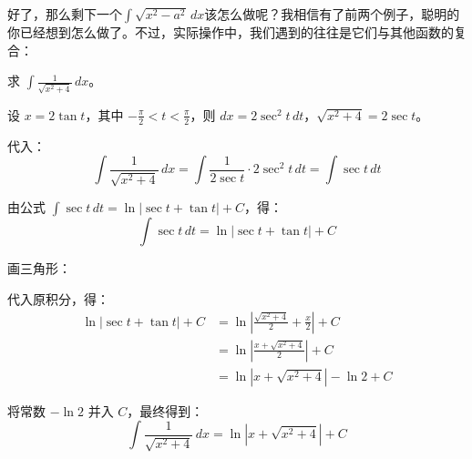 好了，那么剩下一个$\int \sqrt{x^2 - a^2}\, dx$该怎么做呢？我相信有了前两个例子，聪明的你已经想到怎么做了。不过，实际操作中，我们遇到的往往是它们与其他函数的复合：

\begin{myexample}
  求 $\int \frac{1}{\sqrt{x^2 + 4}}\, dx$。

  设 $x = 2\tan t$，其中 $-\frac{\pi}{2} < t < \frac{\pi}{2}$，则 $dx = 2\sec^2 t\, dt$，$\sqrt{x^2 + 4} = 2\sec t$。

代入：
\[
\int \frac{1}{\sqrt{x^2+4}}\, dx = \int \frac{1}{2\sec t} \cdot 2\sec^2 t\, dt = \int \sec t\, dt
\]

由公式 $\displaystyle \int \sec t\,dt = \ln|\sec t + \tan t| + C$，得：
\[
\int \sec t\,dt = \ln|\sec t + \tan t| + C
\]

画三角形：
\begin{center}
\end{center}

代入原积分，得：
\[
\begin{aligned}
\ln|\sec t + \tan t| + C
&= \ln| \frac{\sqrt{x^2+4}}{2} + \frac{x}{2} | + C \\[4pt]
&= \ln| \frac{x + \sqrt{x^2+4}}{2} | + C \\[4pt]
&= \ln| x + \sqrt{x^2+4} | - \ln 2 + C
\end{aligned}
\]

将常数 $-\ln 2$ 并入 $C$，最终得到：
\[
\int \frac{1}{\sqrt{x^2+4}}\,dx = \ln| x + \sqrt{x^2+4} | + C
\]
\end{myexample}

